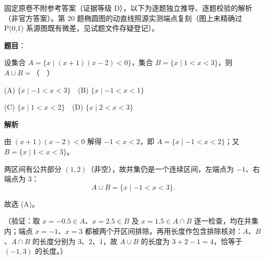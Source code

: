 
\begin{gktip}
固定原卷不附参考答案（证据等级 D），以下为逐题独立推导、逐题校验的解析（非官方答案）。第 20 题椭圆图的动直线照源实测端点复刻（图上未精确过 P(0,1) 系源图既有微差，见试题文件存疑登记）。
\end{gktip}

\begin{answer}

\textbf{题目}：

设集合 \(A=\{x\mid (x+1)(x-2)<0\}\)，集合 \(B=\{x\mid 1<x<3\}\)，则 \(A\cup B=\)（　）

(A) \(\{x\mid -1<x<3\}\)　(B) \(\{x\mid -1<x<1\}\)

(C) \(\{x\mid 1<x<2\}\)　(D) \(\{x\mid 2<x<3\}\)

\textbf{解析}

由 \((x+1)(x-2)<0\) 解得 \(-1<x<2\)，即 \(A=\{x\mid -1<x<2\}\)；又 \(B=\{x\mid 1<x<3\}\)。

两区间有公共部分 \((1,2)\)（非空），故并集仍是一个连续区间，左端点为 \(-1\)、右端点为 \(3\)：
\nopagebreak[4]
\[
A\cup B=\{x\mid -1<x<3\}.
\]

故选 (A)。

（验证：取 \(x=-0.5\in A\)、\(x=2.5\in B\) 及 \(x=1.5\in A\cap B\) 逐一检查，均在并集内；端点 \(x=-1\)、\(x=3\) 都被两个开区间排除。再用长度作包含排除核对：\(A\)、\(B\)、\(A\cap B\) 的长度分别为 \(3\)、\(2\)、\(1\)，故 \(A\cup B\) 的长度为 \(3+2-1=4\)，恰等于 \((-1,3)\) 的长度。）


\end{answer}
